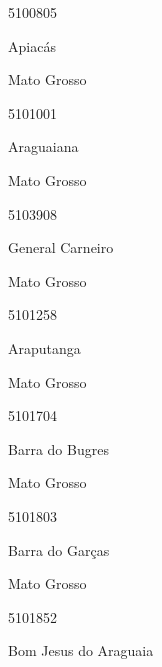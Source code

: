 \documentclass[
  letterpaper,
]{report}
\begin{document}
\n      

5100805

\n      

Apiacás

\n    

\n    

\n      

Mato Grosso

\n      

5101001

\n      

Araguaiana

\n    

\n    

\n      

Mato Grosso

\n      

5103908

\n      

General Carneiro

\n    

\n    

\n      

Mato Grosso

\n      

5101258

\n      

Araputanga

\n    

\n    

\n      

Mato Grosso

\n      

5101704

\n      

Barra do Bugres

\n    

\n    

\n      

Mato Grosso

\n      

5101803

\n      

Barra do Garças

\n    

\n    

\n      

Mato Grosso

\n      

5101852

\n      

Bom Jesus do Araguaia
\end{document}
